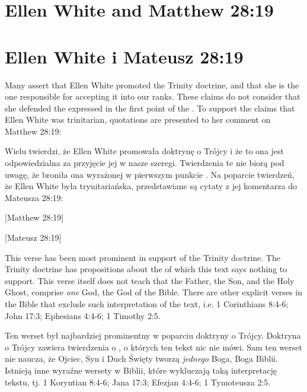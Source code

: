 \chapter{Ellen White and Matthew 28:19}


\chapter{Ellen White i Mateusz 28:19}


Many assert that Ellen White promoted the Trinity doctrine, and that she is the one responsible for accepting it into our ranks. These claims do not consider that she defended the  expressed in the first point of the . To support the claims that Ellen White was trinitarian, quotations are presented to her comment on Matthew 28:19:


Wielu twierdzi, że Ellen White promowała doktrynę o Trójcy i że to ona jest odpowiedzialna za przyjęcie jej w nasze szeregi. Twierdzenia te nie biorą pod uwagę, że broniła ona  wyrażonej w pierwszym punkcie . Na poparcie twierdzeń, że Ellen White była trynitariańska, przedstawiane są cytaty z jej komentarza do Mateusza 28:19:


[Matthew 28:19]


[Mateusz 28:19]


This verse has been most prominent in support of the Trinity doctrine. The Trinity doctrine has propositions about the  of which this text says nothing to support. This verse itself does not teach that the Father, the Son, and the Holy Ghost, comprise \textit{one} God, the God of the Bible. There are other explicit verses in the Bible that exclude such interpretation of the text, i.e. 1 Corinthians 8:4-6; John 17:3; Ephesians 4:4-6; 1 Timothy 2:5.


Ten werset był najbardziej prominentny w poparciu doktryny o Trójcy. Doktryna o Trójcy zawiera twierdzenia o , o których ten tekst nic nie mówi. Sam ten werset nie naucza, że Ojciec, Syn i Duch Święty tworzą \textit{jednego} Boga, Boga Biblii. Istnieją inne wyraźne wersety w Biblii, które wykluczają taką interpretację tekstu, tj. 1 Koryntian 8:4-6; Jana 17:3; Efezjan 4:4-6; 1 Tymoteusza 2:5.


